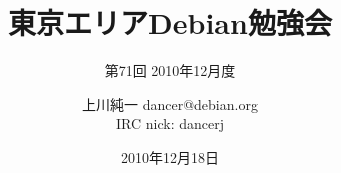 




\documentclass[cjk,dvipdfmx,12pt]{beamer}
\usepackage{monthlypresentation}



\title{東京エリアDebian勉強会}
\subtitle{第71回 2010年12月度}
\author{上川純一 dancer@debian.org\\IRC nick: dancerj}
\date{2010年12月18日}



